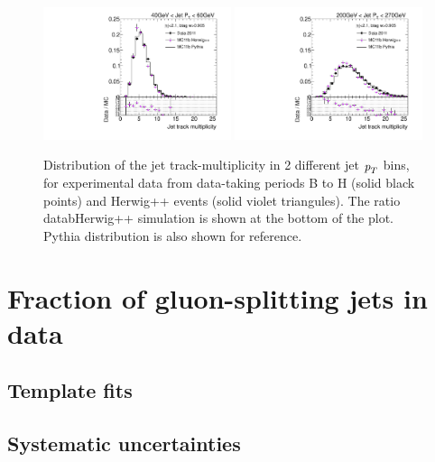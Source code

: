\begin{figure}[tp]
\centering
\includegraphics[width=0.49\textwidth]{FIGS/systematics/DataVarNtrkPT040.pdf}
\includegraphics[width=0.49\textwidth]{FIGS/systematics/DataVarNtrkPT200.pdf}
\caption{Distribution of the jet track-multiplicity in 2 different jet ${\emph{p}_{T}}$ bins, for experimental data from data-taking periods B to H (solid black points) and Herwig++ events (solid violet triangules). The ratio datab\/Herwig++ simulation is shown at the bottom of the plot. Pythia distribution is also shown for reference.}
\label{fig:herwigdatamc}
\end{figure}


%
%
\chapter{Fraction of gluon-splitting jets in data}

\section{Template fits}\label{sec:FractionSystematics}

\section{Systematic uncertainties}\label{sec:FractionSystematics}
